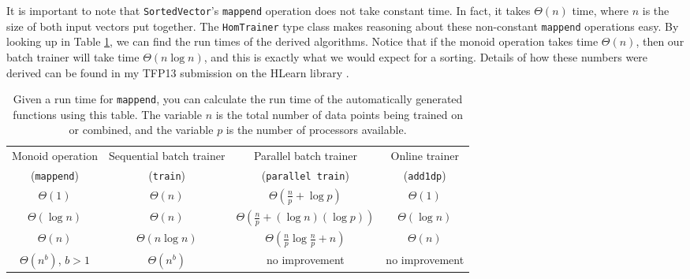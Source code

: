 \documentclass[tikz]{tmr}
\newcommand\h{\lstinline}
\newcommand\+{\mdoubleplus}
\begin{document}
It is important to note that \h{SortedVector}'s \h{mappend} operation does not take constant time.
In fact, it takes $\Theta(n)$ time, where $n$ is the size of both input vectors put together.
The \h{HomTrainer} type class makes reasoning about these non-constant \h{mappend} operations easy.
By looking up in Table \ref{table:rt}, we can find the run times of the derived algorithms.
Notice that if the monoid operation takes time $\Theta(n)$, then our batch trainer will take time $\Theta(n\log n)$, and this is exactly what we would expect for a sorting.
Details of how these numbers were derived can be found in my TFP13 submission on the HLearn library \cite{me_tfp13}.

\begin{table}[H]
\caption{Given a run time for \h{mappend}, you can calculate the run time of the automatically generated functions using this table.  The variable $n$ is the total number of data points being trained on or combined, and the variable $p$ is the number of processors available.}
\label{table:rt}
\hspace{-0.3in}
\begin{tabular}{ c c c c }
\hline
Monoid operation & Sequential batch trainer & \ \ Parallel batch trainer\ \ & Online trainer\\
\mbox{(\h{mappend})} & \mbox{(\h{train})} & \mbox{(\h{parallel train})} & \mbox{(\h{add1dp})}\\
\hline \hline
$\Theta(1)$ & $\Theta(n)$ & $\Theta\left(\frac{n}{p}+\log p\right)$ & $\Theta(1)$ \\
$\Theta(\log n)$ & $\Theta(n)$ & $\Theta\left(\frac{n}{p}+(\log n)(\log p)\right)$ & $\Theta(\log n)$ \\
$\Theta(n)$ & $\Theta(n\log n)$ & $\Theta\left(\frac{n}{p}\log\frac{n}{p}+n\right)$ & $\Theta(n)$ \\
$\Theta(n^b)$, $b>1$ & $\Theta(n^b)$ & no improvement & no improvement\\
\hline
\end{tabular}
\end{table}
\end{document}
